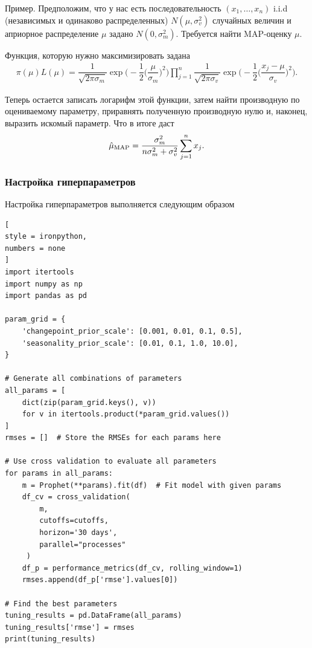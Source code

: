 \documentclass[%
	11pt,
	a4paper,
	utf8,
		]{article}
\begin{document}
Пример. Предположим, что у нас есть последовательность $ (x_1, \dots, x_n) $ i.i.d (независимых и одинаково распределенных) $ N(\mu, \sigma_v^2) $ случайных величин и априорное распределение $ \mu $ задано $ N(0, \sigma_m^2) $. Требуется найти MAP-оценку $ \mu $.

Функция, которую нужно максимизировать задана
\begin{align*}
	\pi(\mu)L(\mu) = \dfrac{1}{\sqrt{2\pi \sigma_m}} \exp \Bigg( - \dfrac{1}{2}\Big(\dfrac{\mu}{\sigma_m}\Big)^2 \Bigg) \prod_{j=1}^{n} \dfrac{1}{\sqrt{2\pi \sigma_v}} \exp \Bigg( -\dfrac{1}{2}\Big( \dfrac{x_j - \mu}{\sigma_v} \Big)^2 \Bigg).
\end{align*}

Теперь остается записать логарифм этой функции, затем найти производную по оцениваемому параметру, приравнять полученную производную нулю и, наконец, выразить искомый параметр. Что в итоге даст
\begin{align*}
    \hat{\mu}_{\rm MAP} = \dfrac{\sigma_m^2}{n\sigma_m^2 + \sigma_v^2} \sum_{j=1}^{n}x_j.
\end{align*}

\subsubsection{Настройка гиперпараметров}

Настройка гиперпараметров выполняется следующим образом
\begin{lstlisting}[
style = ironpython,
numbers = none	
]
import itertools
import numpy as np
import pandas as pd

param_grid = {
	'changepoint_prior_scale': [0.001, 0.01, 0.1, 0.5],
	'seasonality_prior_scale': [0.01, 0.1, 1.0, 10.0],
}

# Generate all combinations of parameters
all_params = [
    dict(zip(param_grid.keys(), v))
    for v in itertools.product(*param_grid.values())
]
rmses = []  # Store the RMSEs for each params here

# Use cross validation to evaluate all parameters
for params in all_params:
    m = Prophet(**params).fit(df)  # Fit model with given params
    df_cv = cross_validation(
        m,
        cutoffs=cutoffs,
        horizon='30 days',
        parallel="processes"
     )
    df_p = performance_metrics(df_cv, rolling_window=1)
    rmses.append(df_p['rmse'].values[0])

# Find the best parameters
tuning_results = pd.DataFrame(all_params)
tuning_results['rmse'] = rmses
print(tuning_results)
\end{lstlisting}
\end{document}
